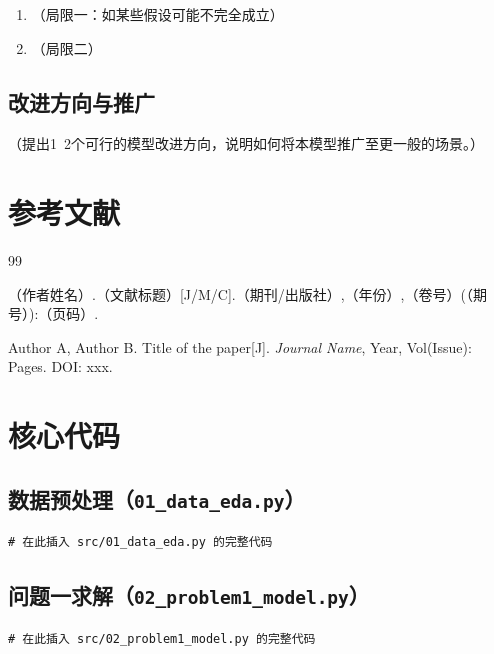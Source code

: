 \documentclass[12pt, a4paper]{article}
\begin{document}
\begin{enumerate}
    \item （局限一：如某些假设可能不完全成立）
    \item （局限二）
\end{enumerate}

\subsection{改进方向与推广}

（提出1~2个可行的模型改进方向，说明如何将本模型推广至更一般的场景。）

\section*{参考文献}

\begin{thebibliography}{99}

（作者姓名）.（文献标题）[J/M/C].（期刊/出版社）,（年份）,（卷号）(（期号）):（页码）.

Author A, Author B. Title of the paper[J]. \textit{Journal Name}, Year, Vol(Issue): Pages. DOI: xxx.


\end{thebibliography}

\appendix
\section{核心代码}

\subsection{数据预处理（\texttt{01\_data\_eda.py}）}

\begin{lstlisting}[style=pythonstyle, caption={数据探索与预处理}]
# 在此插入 src/01_data_eda.py 的完整代码
\end{lstlisting}

\subsection{问题一求解（\texttt{02\_problem1\_model.py}）}

\begin{lstlisting}[style=pythonstyle, caption={问题一建模与求解}]
# 在此插入 src/02_problem1_model.py 的完整代码
\end{lstlisting}

\end{document}
